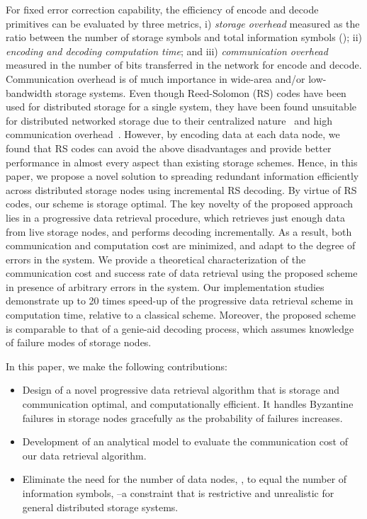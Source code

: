 \documentclass[10pt,journal,letterpaper,compsoc]{IEEEtran}
\newcommand{\0}{{\bf 0}}
\begin{document}
For fixed error correction capability, the efficiency of encode and decode
primitives can be evaluated by three metrics, i) {\it storage overhead}
measured as the ratio between the number of storage symbols and total
information symbols (); ii) {\it encoding and decoding computation time};
and iii) {\it communication overhead} measured in the number of bits
transferred in the network for encode and decode. Communication overhead is of
much importance in wide-area and/or low-bandwidth storage systems. Even though Reed-Solomon (RS) codes have been used for distributed storage for a single system, they have been found unsuitable for distributed networked storage due to their centralized nature~\cite{DIM06} and high communication overhead~\cite{lin2007dpl}. However, by encoding data at each data node, we found that RS codes can avoid the above disadvantages and provide better performance in almost every aspect than existing storage schemes. Hence, in this
paper, we propose a novel solution to spreading redundant information efficiently
across distributed storage nodes using incremental RS decoding.
By virtue of RS codes, our scheme is storage optimal. The key novelty of the proposed
approach lies in a progressive data retrieval procedure, which retrieves
just enough data from live storage nodes, and performs decoding
incrementally.  As a result, both communication and computation cost are
minimized, and adapt to the degree of errors in the system. We
provide a theoretical characterization of the communication cost and success
rate of data retrieval using the proposed scheme in presence of arbitrary
errors in the system. Our implementation studies demonstrate up to 20 times
speed-up of the progressive data retrieval scheme in computation time, relative
to a classical scheme. Moreover, the proposed scheme is comparable to that of a
genie-aid decoding process, which assumes knowledge of failure modes of storage
nodes.

In this paper, we make the following contributions:
\begin{itemize}
\item Design of a novel progressive data retrieval algorithm that is storage
and communication optimal, and computationally efficient. It handles Byzantine
failures in storage nodes gracefully as the probability of failures increases.
\item Development of an analytical model to evaluate the communication cost of
our data retrieval algorithm.
\item Eliminate the need for the number of data nodes, , to equal the number of
information symbols, --a constraint that is restrictive and unrealistic
for general distributed storage systems.
\end{itemize}
\end{document}
